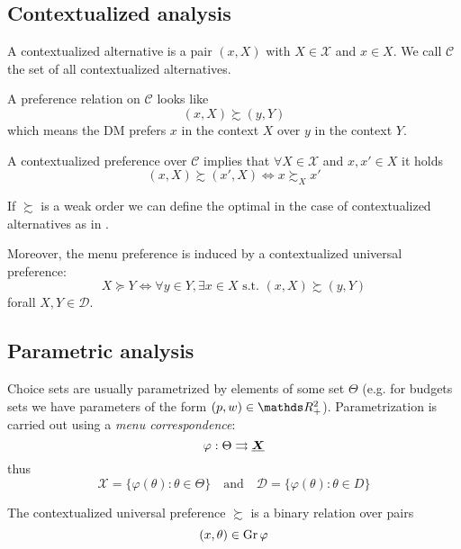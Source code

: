 \documentclass[12pt]{extarticle}
\renewcommand{\vec}[1]{\uvec{#1}}
\newcommand{\Gr}{{\operatorfont Gr} \,}
\begin{document}
\subsection{Contextualized analysis}

A contextualized alternative is a pair $(x, X)$ with $X \in \mathcal X$ and $x \in X$.
We call $\mathcal C$ the set of all contextualized alternatives.

A preference relation on $\mathcal C$ looks like
\begin{equation}
	(x, X) \succsim (y, Y)
\end{equation}
which means the DM prefers $x$ in the context $X$ over $y$ in the context $Y$.

A contextualized preference over $\mathcal C$ implies that $\forall X \in \mathcal X$ and $x, x' \in X$ it holds
\begin{equation}
	(x, X) \succsim (x', X) \iff x \succsim_X x'
\end{equation}

If $\succsim$ is a weak order we can define the optimal in the case of contextualized alternatives as in .

Moreover, the menu preference is induced by a contextualized universal preference:
\begin{equation}
	X \succeq Y \iff \forall y \in Y, \exists x \in X \text{ s.t. } (x, X) \succsim (y, Y)
\end{equation}
forall $X, Y \in \mathcal D$.

\subsection{Parametric analysis}

Choice sets are usually parametrized by elements of some set $\Theta$ (e.g. for budgets sets we have parameters of the form $(p, w) \in \R^2_+$).
Parametrization is carried out using a \emph{menu correspondence}:
\begin{equation}
	\varphi: \Theta \rightrightarrows \vec X
\end{equation}
thus
\begin{equation}
	\mathcal X = \{ \varphi(\theta) : \theta \in \Theta \} \quad \text{and} \quad \mathcal D = \{ \varphi(\theta) : \theta \in D \}
\end{equation}

The contextualized universal preference $\succsim$ is a binary relation over pairs
\begin{equation}
	(x, \theta) \in \Gr \varphi
\end{equation}
\end{document}
